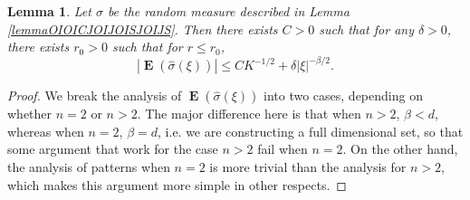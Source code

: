 \documentclass[dvipsnames,letterpaper,12pt]{article}
\numberwithin{equation}{section}
\DeclareMathOperator{\TT}{\mathbf{T}}
\newtheorem{lemma}[theorem]{Lemma}
\numberwithin{theorem}{section}
\DeclareMathOperator{\EE}{\mathbf{E}}
\DeclareMathOperator{\PP}{\mathbf{P}}
\begin{document}
\begin{lemma} \label{lemmaOIJIOCJSOIJSIOJ123}
    Let $\sigma$ be the random measure described in Lemma \ref{lemmaOIOICJOIJOISJOIJS}. Then there exists $C > 0$ such that for any $\delta > 0$, there exists $r_0 > 0$ such that for $r \leq r_0$,
    \[ |\EE(\widehat{\sigma}(\xi))| \leq CK^{-1/2} + \delta |\xi|^{-\beta/2}. \]
\end{lemma}
\begin{proof}
    We break the analysis of $\EE(\widehat{\sigma}(\xi))$ into two cases, depending on whether $n = 2$ or $n > 2$. The major difference here is that when $n > 2$, $\beta < d$, whereas when $n = 2$, $\beta = d$, i.e.  we are constructing a full dimensional set,  so that some argument that work for the case $n > 2$ fail when $n = 2$. On the other hand, the analysis of patterns when $n = 2$ is more trivial than the analysis for $n > 2$, which makes this argument more simple in other respects.
%
%
%
%


\end{proof}
\end{document}

